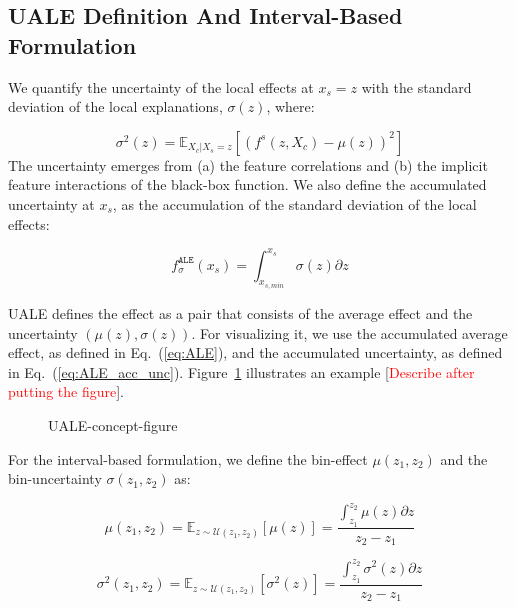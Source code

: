 \documentclass[twoside]{article}
\newcommand{\dfdx}{f^s}
\newcommand{\todo}[1]{[\textcolor{red}{#1}]}
\begin{document}
\subsection{UALE Definition And Interval-Based Formulation}
\label{sec:UALE-definition-1}

We quantify the uncertainty of the local effects at \(x_s=z\) with the
standard deviation of the local explanations, \(\sigma(z)\), where:

\begin{equation}
  \label{eq:ALE_var}
  \sigma^2(z) = \mathbb{E}_{X_c|X_s=z}\left [ \left (\dfdx (z, X_c) - \mu(z) \right )^2 \right ] 
\end{equation}
\noindent
The uncertainty emerges from (a) the feature correlations and (b) the
implicit feature interactions of the black-box function. We also
define the accumulated uncertainty at \(x_s\), as the accumulation of
the standard deviation of the local effects:

\begin{equation}
  \label{eq:ALE_acc_unc}
  f^{\mathtt{ALE}}_{\sigma}(x_s) = \int_{x_{s, min}}^{x_s} \sigma(z) \partial z
\end{equation}
\noindent

UALE defines the effect as a pair that consists of the average effect
and the uncertainty \((\mu(z), \sigma(z))\). For visualizing it, we
use the accumulated average effect, as defined in Eq.~(\ref{eq:ALE}),
and the accumulated uncertainty, as defined in
Eq.~(\ref{eq:ALE_acc_unc}). Figure~\ref{fig:UALE-figure} illustrates
an example \todo{Describe after putting the figure}.

\begin{figure}
  \centering
  \caption{UALE-concept-figure}
  \label{fig:UALE-figure}
\end{figure}

For the interval-based formulation, we define the bin-effect
\(\mu(z_1, z_2)\) and the bin-uncertainty \(\sigma(z_1, z_2)\) as:

\begin{equation}
  \label{eq:mu_bin}
    \mu(z_1, z_2) = \mathbb{E}_{z \sim \mathcal{U}(z_1,z_2)} [\mu(z)]
    = \frac{\int_{z_1}^{z_2} \mu(z) \partial z}{z_2 - z_1}
\end{equation}

\begin{equation}
  \label{eq:var_bin}
  \sigma^2(z_1, z_2) = \mathbb{E}_{z \sim \mathcal{U}(z_1,z_2)} [\sigma^2(z)] =  \frac{\int_{z_1}^{z_2} \sigma^2(z)  \partial z}{z_2 - z_1}
\end{equation}
\end{document}
